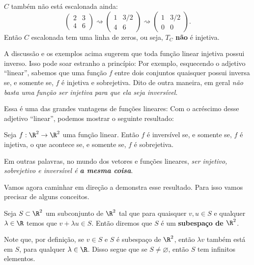 \begin{ex}
	$C$ também não está escalonada ainda:
	\[\begin{pmatrix}
	2&3\\4&6
	\end{pmatrix}\rightsquigarrow\begin{pmatrix}
	1&3/2\\4&6
	\end{pmatrix}\rightsquigarrow\begin{pmatrix}
	1&3/2\\0&0
	\end{pmatrix}.\] Então $C$ escalonada tem uma linha de zeros, ou seja, $T_C$ \textbf{não} é injetiva.
\end{ex}

A discussão e os exemplos acima sugerem que toda função linear injetiva possui inverso. Isso pode soar estranho a princípio: Por exemplo, esquecendo o adjetivo ``linear'', sabemos que uma função $f$ entre dois conjuntos quaisquer possui inversa se, e somente se, $f$ é injetiva e sobrejetiva. Dito de outra maneira, em geral \textit{não basta uma função ser injetiva para que ela seja inversível}.

Essa é uma das grandes vantagens de funções lineares: Com o acréscimo desse adjetivo ``linear'', podemos mostrar o seguinte resultado:

\begin{theorem}
	Seja $f:\R^2\to \R^2$ uma função linear. Então $f$ é inversível se, e somente se, $f$ é injetiva, o que acontece se, e somente se, $f$ é sobrejetiva.
\end{theorem}

Em outras palavras, no mundo dos vetores e funções lineares, \textit{ser injetivo, sobrejetivo e inversível é \textbf{a mesma coisa}}.

Vamos agora caminhar em direção a demonstra esse resultado. Para isso vamos precisar de alguns conceitos.

\begin{df}
	Seja $S\subset \R^2$ um subconjunto de $\R^2$ tal que para quaisquer $v,u\in S$ e qualquer $\lambda\in\R$ temos que $v+\lambda u\in S$. Então diremos que $S$ é um \textbf{subespaço de $\R^2$}.
\end{df}

\begin{rmk}
	Note que, por definição, se $v\in S$ e $S$ é subespaço de $\R^2$, então $\lambda v$ também está em $S$, para qualquer $\lambda\in \R$. Disso segue que se $S\neq \varnothing$, então $S$ tem infinitos elementos.
\end{rmk}

